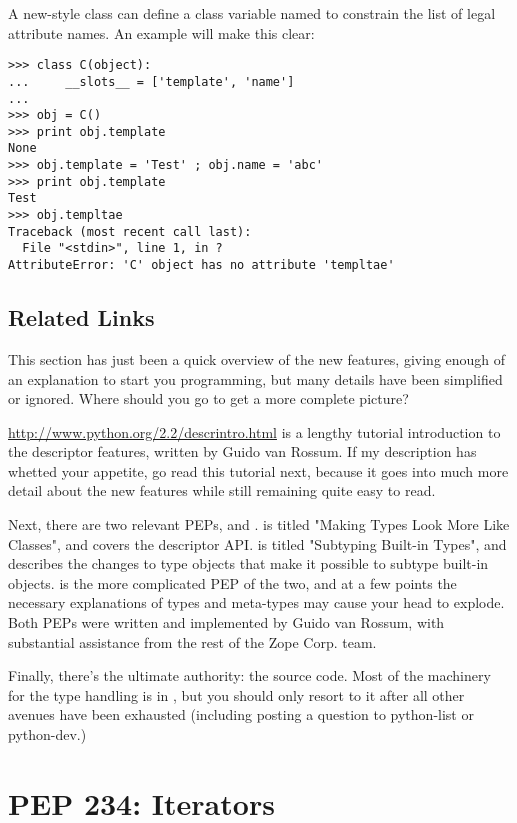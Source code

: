 \documentclass{howto}
\begin{document}
A new-style class can define a class variable named 
to constrain the list of legal attribute names.  An example will make
this clear:

\begin{verbatim}
>>> class C(object):
...     __slots__ = ['template', 'name']
...
>>> obj = C()
>>> print obj.template
None
>>> obj.template = 'Test' ; obj.name = 'abc'
>>> print obj.template
Test
>>> obj.templtae
Traceback (most recent call last):
  File "<stdin>", line 1, in ?
AttributeError: 'C' object has no attribute 'templtae'
\end{verbatim}



\subsection{Related Links}
\label{sect-rellinks}

This section has just been a quick overview of the new features,
giving enough of an explanation to start you programming, but many
details have been simplified or ignored.  Where should you go to get a
more complete picture?

\url{http://www.python.org/2.2/descrintro.html} is a lengthy tutorial
introduction to the descriptor features, written by Guido van Rossum.
If my description has whetted your appetite, go read this tutorial
next, because it goes into much more detail about the new features
while still remaining quite easy to read.

Next, there are two relevant PEPs,  and .  
is titled "Making Types Look More Like Classes", and covers the
descriptor API.   is titled "Subtyping Built-in Types", and
describes the changes to type objects that make it possible to subtype
built-in objects.   is the more complicated PEP of the two,
and at a few points the necessary explanations of types and meta-types
may cause your head to explode.  Both PEPs were written and
implemented by Guido van Rossum, with substantial assistance from the
rest of the Zope Corp. team.

Finally, there's the ultimate authority: the source code.  Most of the
machinery for the type handling is in , but
you should only resort to it after all other avenues have been
exhausted (including posting a question to python-list or python-dev.)


\section{PEP 234: Iterators}
\end{document}
